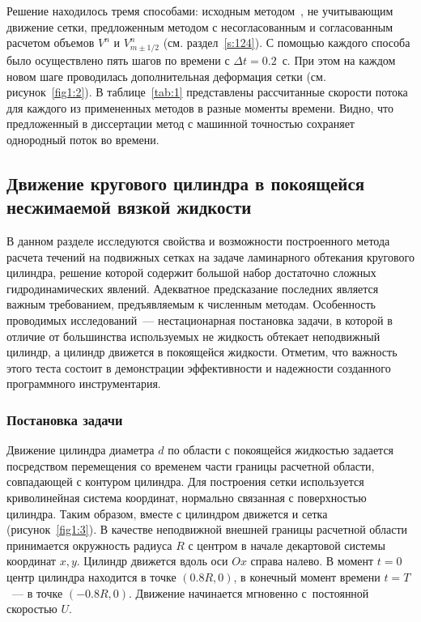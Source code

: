 Решение находилось тремя способами: исходным методом~\cite{Cher}, не учитывающим движение сетки, 
предложенным методом с несогласованным и согласованным расчетом 
объемов $V^n$ и $V^n_{m\pm 1/2}$ (см. раздел~\ref{s:124}). 
С помощью каждого способа было осуществлено пять шагов по времени с $\Delta t=0.2$~с. При 
этом на каждом новом шаге проводилась дополнительная деформация 
сетки (см. рисунок~\ref{fig1:2}). В таблице~\ref{tab:1} представлены рассчитанные скорости потока 
для каждого из примененных методов в разные моменты времени. Видно, что предложенный в диссертации 
метод с машинной точностью сохраняет однородный поток во времени.

\subsection{Движение кругового цилиндра в покоящейся несжимаемой вязкой жидкости}
\label{s:152}
В данном разделе исследуются свойства и возможности построенного метода расчета течений на подвижных сетках 
на задаче ламинарного обтекания кругового цилиндра, решение которой содержит большой набор достаточно сложных 
гидродинамических явлений. Адекватное предсказание последних является важным требованием, предъявляемым
к численным методам. Особенность проводимых исследований~---  нестационарная постановка задачи, в которой в
отличие от большинства используемых не жидкость обтекает неподвижный цилиндр, а цилиндр движется в 
покоящейся жидкости. Отметим, что важность этого теста состоит  в демонстрации эффективности и
надежности созданного программного инструментария.

\subsubsection{Постановка задачи}
\label{s:1521}
Движение цилиндра диаметра $d$ по области с покоящейся жидкостью задается посредством перемещения со временем 
части границы расчетной области, совпадающей с контуром цилиндра. Для построения сетки используется 
криволинейная система координат, нормально связанная с поверхностью цилиндра. Таким образом, вместе с
цилиндром движется и сетка (рисунок~\ref{fig1:3}). В качестве неподвижной внешней границы расчетной области 
принимается окружность радиуса $R$ с центром в начале декартовой системы координат $x,y$. Цилиндр
движется вдоль оси $Ox$ справа налево. В момент $t=0$ центр цилиндра находится в точке $(0.8R, 0)$, в 
конечный момент времени $t=T$~--- в точке $(-0.8R, 0)$. Движение начинается мгновенно с~постоянной 
скоростью $U$.

